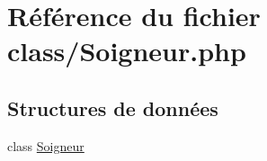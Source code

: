 \hypertarget{_soigneur_8php}{}\section{Référence du fichier class/\+Soigneur.php}
\label{_soigneur_8php}
\subsection*{Structures de données}
\begin{DoxyCompactItemize}
\item 
class \mbox{\hyperlink{class_soigneur}{Soigneur}}
\end{DoxyCompactItemize}
